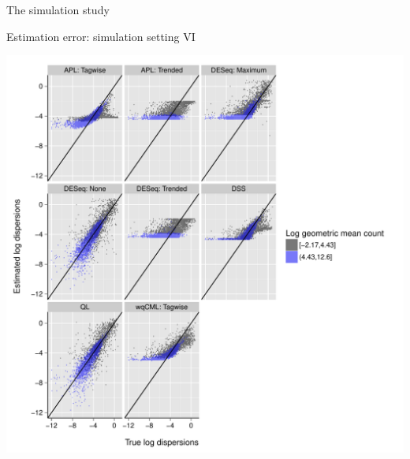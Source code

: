 \documentclass{beamer}
\begin{document}
\begin{frame}
\begin{columns}[t]
\begin{column}{.33\linewidth}
\begin{block}{The simulation study}
\begin{itemize}


\end{itemize}
\end{block}




 \begin{block}{Estimation error: simulation setting VI}
\begin{center}
\includegraphics{../fig/phi_vs_phi_VI_slides.pdf} 
\end{center}
\end{block}













\end{column}
\end{columns}
\end{frame}
\end{document}
